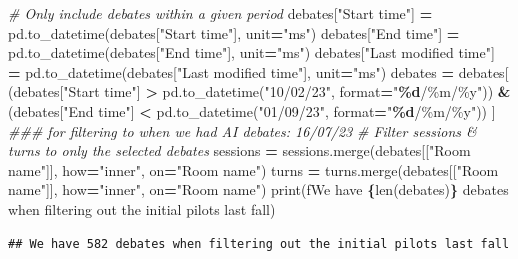 \documentclass[
]{article}
\newenvironment{Shaded}{\begin{snugshade}}{\end{snugshade}}
\newcommand{\BuiltInTok}[1]{#1}
\newcommand{\CommentTok}[1]{\textcolor[rgb]{0.56,0.35,0.01}{\textit{#1}}}
\newcommand{\NormalTok}[1]{#1}
\newcommand{\OperatorTok}[1]{\textcolor[rgb]{0.81,0.36,0.00}{\textbf{#1}}}
\newcommand{\SpecialCharTok}[1]{\textcolor[rgb]{0.81,0.36,0.00}{\textbf{#1}}}
\newcommand{\SpecialStringTok}[1]{\textcolor[rgb]{0.31,0.60,0.02}{#1}}
\newcommand{\StringTok}[1]{\textcolor[rgb]{0.31,0.60,0.02}{#1}}
\begin{document}
\begin{Shaded}
\begin{Highlighting}[]
\CommentTok{\# Only include debates within a given period}
\NormalTok{debates[}\StringTok{"Start time"}\NormalTok{] }\OperatorTok{=}\NormalTok{ pd.to\_datetime(debates[}\StringTok{"Start time"}\NormalTok{], unit}\OperatorTok{=}\StringTok{"ms"}\NormalTok{)}
\NormalTok{debates[}\StringTok{"End time"}\NormalTok{] }\OperatorTok{=}\NormalTok{ pd.to\_datetime(debates[}\StringTok{"End time"}\NormalTok{], unit}\OperatorTok{=}\StringTok{"ms"}\NormalTok{)}
\NormalTok{debates[}\StringTok{"Last modified time"}\NormalTok{] }\OperatorTok{=}\NormalTok{ pd.to\_datetime(debates[}\StringTok{"Last modified time"}\NormalTok{], unit}\OperatorTok{=}\StringTok{"ms"}\NormalTok{)}
\NormalTok{debates }\OperatorTok{=}\NormalTok{ debates[}
\NormalTok{    (debates[}\StringTok{"Start time"}\NormalTok{] }\OperatorTok{\textgreater{}}\NormalTok{ pd.to\_datetime(}\StringTok{"10/02/23"}\NormalTok{, }\BuiltInTok{format}\OperatorTok{=}\StringTok{"}\SpecialCharTok{\%d}\StringTok{/\%m/\%y"}\NormalTok{)) }\OperatorTok{\&}
\NormalTok{    (debates[}\StringTok{"End time"}\NormalTok{] }\OperatorTok{\textless{}}\NormalTok{ pd.to\_datetime(}\StringTok{"01/09/23"}\NormalTok{, }\BuiltInTok{format}\OperatorTok{=}\StringTok{"}\SpecialCharTok{\%d}\StringTok{/\%m/\%y"}\NormalTok{))}
\NormalTok{]}
\CommentTok{\#\#\# for filtering to when we had AI debates: 16/07/23}
\CommentTok{\# Filter sessions \& turns to only the selected debates}
\NormalTok{sessions }\OperatorTok{=}\NormalTok{ sessions.merge(debates[[}\StringTok{"Room name"}\NormalTok{]], how}\OperatorTok{=}\StringTok{"inner"}\NormalTok{, on}\OperatorTok{=}\StringTok{"Room name"}\NormalTok{)}
\NormalTok{turns }\OperatorTok{=}\NormalTok{ turns.merge(debates[[}\StringTok{"Room name"}\NormalTok{]], how}\OperatorTok{=}\StringTok{"inner"}\NormalTok{, on}\OperatorTok{=}\StringTok{"Room name"}\NormalTok{)}
\BuiltInTok{print}\NormalTok{(}\SpecialStringTok{f\textquotesingle{}We have }\SpecialCharTok{\{}\BuiltInTok{len}\NormalTok{(debates)}\SpecialCharTok{\}}\SpecialStringTok{ debates when filtering out the initial pilots last fall\textquotesingle{}}\NormalTok{)}
\end{Highlighting}
\end{Shaded}

\begin{verbatim}
## We have 582 debates when filtering out the initial pilots last fall
\end{verbatim}
\end{document}
